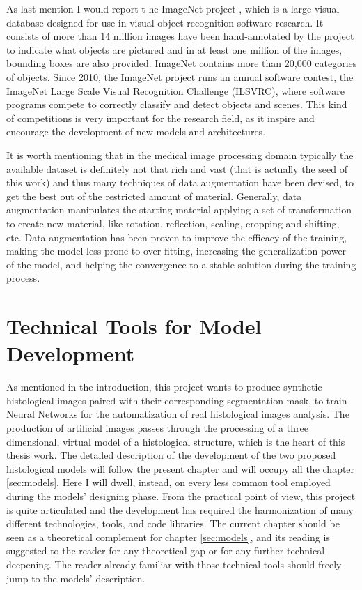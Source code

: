 \documentclass[12pt,a4paper]{report}
\begin{document}
As last mention I would report t he ImageNet project \cite{5206848}, which is a large visual database designed for use in visual object recognition software research. It consists of more than 14 million images have been hand-annotated by the project to indicate what objects are pictured and in at least one million of the images, bounding boxes are also provided. ImageNet contains more than 20,000 categories of objects. Since 2010, the ImageNet project runs an annual software contest, the ImageNet Large Scale Visual Recognition Challenge (ILSVRC), where software programs compete to correctly classify and detect objects and scenes. This kind of competitions is very important for the research field, as it inspire and encourage the development of new models and architectures.

It is worth mentioning that in the medical image processing domain typically the available dataset is definitely not that rich and vast (that is actually the seed of this work) and thus many techniques of data augmentation have been devised, to get the best out of the restricted amount of material. Generally, data augmentation manipulates the starting material applying a set of transformation to create new material, like rotation, reflection, scaling, cropping and shifting, etc. Data augmentation has been proven to improve the efficacy of the training, making the model less prone to over-fitting, increasing the generalization power of the model, and helping the convergence to a stable solution during the training process.

        \clearpage

    \chapter{Technical Tools for Model Development} \label{sec:tech_tool}
        As mentioned in the introduction, this project wants to produce synthetic histological images paired with their corresponding segmentation mask, to train Neural Networks for the automatization of real histological images analysis. The production of artificial images passes through the processing of a three dimensional, virtual model of a histological structure, which is the heart of this thesis work. The detailed description of the development of the two proposed histological models will follow the present chapter and will occupy all the chapter \ref{sec:models}. Here I will dwell, instead, on every less common tool employed during the models' designing phase. From the practical point of view, this project is quite articulated and the development has required the harmonization of many different technologies, tools, and code libraries. The current chapter should be seen as a theoretical complement for chapter \ref{sec:models}, and its reading is suggested to the reader for any theoretical gap or for any further technical deepening. The reader already familiar with those technical tools should freely jump to the models' description.
\end{document}
